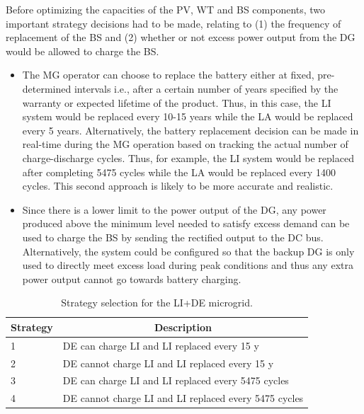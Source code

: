 \documentclass[final,3p,times]{elsarticle}
\begin{document}
Before optimizing the capacities of the PV, WT and BS components, two important strategy decisions had to be made, relating to (1) the frequency of replacement of the BS and (2) whether or not excess power output from the DG would be allowed to charge the BS. 
\begin{itemize}
    \item The MG operator can choose to replace the battery either at fixed, pre-determined intervals i.e., after a certain number of years specified by the warranty or expected lifetime of the product. Thus, in this case, the LI system would be replaced every 10-15 years while the LA would be replaced every 5 years. Alternatively, the battery replacement decision can be made in real-time during the MG operation based on tracking the actual number of charge-discharge cycles. Thus, for example, the LI system would be replaced after completing 5475 cycles while the LA would be replaced every 1400 cycles. This second approach is likely to be more accurate and realistic.
    \item Since there is a lower limit to the power output of the DG, any power produced above the minimum level needed to satisfy excess demand can be used to charge the BS by sending the rectified output to the DC bus. Alternatively, the system could be configured so that the backup DG is only used to directly meet excess load during peak conditions and thus any extra power output cannot go towards battery charging.
\end{itemize}

\begin{table}[htbp] 
\centering
\begin{tabular}{p{0.75cm} p{10cm}}
\toprule
\multicolumn{1}{c}{\textbf{Strategy}} & \multicolumn{1}{c}{\textbf{Description}}    \\
\midrule
1 & DE can charge LI and LI replaced every 15 y \\[1ex]
2 & DE cannot charge LI and LI replaced every 15 y \\[1ex]
3 & DE can charge LI and LI replaced every 5475 cycles \\[1ex]
4 & DE cannot charge LI and LI replaced every 5475 cycles \\
\bottomrule
\end{tabular}
\caption{Strategy selection for the LI+DE microgrid.}
\label{tab:strat_select} 
\end{table}
\end{document}

